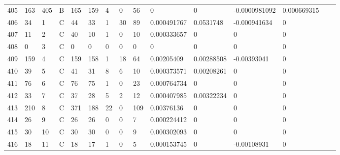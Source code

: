 \begin{longtable}{lllllllllllllll}
	405 & 163               & 405 & B   & 165               & 159               & 4                 & 0    & 56         & 0              & 0              & -0.0000981092 & 0.000669315  \\
	406 & 34                & 1   & C   & 44                & 33                & 1                 & 30   & 89         & 0.000491767    & 0.0531748      & -0.000941634  & 0            \\
	407 & 11                & 2   & C   & 40                & 10                & 1                 & 0    & 10         & 0.000333657    & 0              & 0             & 0            \\
	408 & 0                 & 3   & C   & 0                 & 0                 & 0                 & 0    & 0          & 0              & 0              & 0             & 0            \\
	409 & 159               & 4   & C   & 159               & 158               & 1                 & 18   & 64         & 0.00205409     & 0.00288508     & -0.00393041   & 0            \\
	410 & 39                & 5   & C   & 41                & 31                & 8                 & 6    & 10         & 0.000373571    & 0.00208261     & 0             & 0            \\
	411 & 76                & 6   & C   & 76                & 75                & 1                 & 0    & 23         & 0.000764734    & 0              & 0             & 0            \\
	412 & 33                & 7   & C   & 37                & 28                & 5                 & 2    & 12         & 0.000407985    & 0.00322234     & 0             & 0            \\
	413 & 210               & 8   & C   & 371               & 188               & 22                & 0    & 109        & 0.00376136     & 0              & 0             & 0            \\
	414 & 26                & 9   & C   & 26                & 26                & 0                 & 0    & 7          & 0.000224412    & 0              & 0             & 0            \\
	415 & 30                & 10  & C   & 30                & 30                & 0                 & 0    & 9          & 0.000302093    & 0              & 0             & 0            \\
	416 & 18                & 11  & C   & 18                & 17                & 1                 & 0    & 5          & 0.000153745    & 0              & -0.00108931   & 0            \\

\end{longtable}
